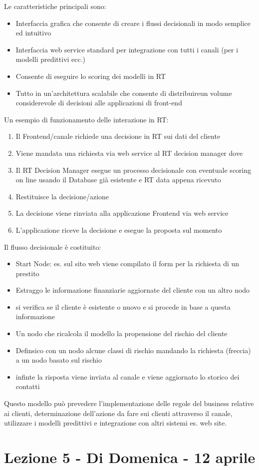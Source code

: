 \documentclass[11pt]{article}
\newenvironment{nosepitemize}{\begin{itemize}[noitemsep,topsep=0ex]}{\end{itemize}}
\begin{document}
Le caratteristiche principali sono:
\begin{nosepitemize}
	\item Interfaccia grafica che consente di creare i flussi decisionali in modo semplice ed intuitivo
	\item Interfaccia web service standard per integrazione con tutti i canali (per i modelli predittivi ecc.)
	\item Consente di eseguire lo scoring dei modelli in RT
	\item Tutto in un'architettura scalabile che consente di distribuireun volume considerevole di decisioni alle applicazioni di front-end
\end{nosepitemize}
Un esempio di funzionamento delle interazione in RT:
\begin{enumerate}[noitemsep,topsep=0ex]
	\item Il Frontend/canale richiede una decisione in RT sui dati del cliente
	\item Viene mandata una richiesta via web service al RT decision manager dove
	\item Il RT Decision Manager esegue un processo decisionale con eventuale scoring on line usando il Database già esistente e RT data appena ricevuto
	\item Restituisce la decisione/azione
	\item La decisione viene rinviata alla applicazione Frontend via web service
	\item L'applicazione riceve la decisione e esegue la proposta sul momento
\end{enumerate} 

Il flusso decisionale è costituito:
\begin{nosepitemize}
	\item Start Node: es. sul sito web viene compilato il form per la richiesta di un prestito
	\item Estraggo le informazione finanziarie aggiornate del cliente con un altro nodo
	\item si verifica se il cliente è esistente o nuovo e si procede in base a questa informazione
	\item Un nodo che ricalcola il modello la propensione del rischio del cliente
	\item Definsico con un nodo alcune classi di rischio mandando la richiesta (freccia) a un nodo basato sul rischio
	\item infinte la risposta viene inviata al canale e viene aggiornato lo storico dei contatti
\end{nosepitemize}
Questo modello può prevedere l'implementazione delle regole del business relative ai clienti, determinazione dell'azione da fare sui clienti attraverso il canale, utilizzare i modelli predittivi e integrazione con altri sistemi es. web site.

\section{Lezione 5 - Di Domenica - 12 aprile}
\end{document}
